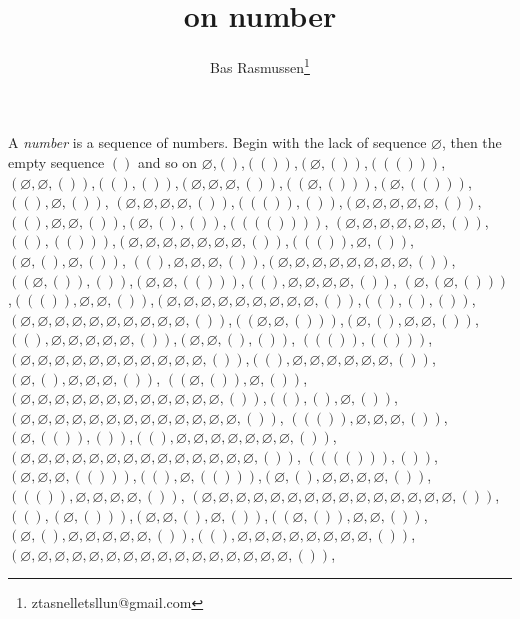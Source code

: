 \documentclass[12pt]{article}
\title{on number}
\author{Bas Rasmussen\thanks{ztasnelletsllun@gmail.com}}
\def\qua{()}
\newcommand{\quat}[1]{\left( #1 \right)}
\def\nul{\varnothing}
\begin{document}
\maketitle

A \emph{number} is a sequence of numbers.  Begin with the lack of sequence $\nul$, then the empty sequence $\qua$ and so on
$\nul$,$\qua$,$\quat{\qua}$,$\quat{\nul,\qua}$,$\quat{\quat{\qua}}$,$\quat{\nul,\nul,\qua}$,$\quat{\qua,\qua}$,$\quat{\nul,\nul,\nul,\qua}$,$\quat{\quat{\nul,\qua}}$,$\quat{\nul,\quat{\qua}}$,$\quat{\qua,\nul,\qua}$,
$\quat{\nul,\nul,\nul,\nul,\qua}$,$\quat{\quat{\qua},\qua}$,$\quat{\nul,\nul,\nul,\nul,\nul,\qua}$,$\quat{\qua,\nul,\nul,\qua}$,$\quat{\nul,\qua,\qua}$,$\quat{\quat{\quat{\qua}}}$,
$\quat{\nul,\nul,\nul,\nul,\nul,\nul,\qua}$,$\quat{\qua,\quat{\qua}}$,$\quat{\nul,\nul,\nul,\nul,\nul,\nul,\nul,\qua}$,$\quat{\quat{\qua},\nul,\qua}$,$\quat{\nul,\qua,\nul,\qua}$,
$\quat{\qua,\nul,\nul,\nul,\qua}$,$\quat{\nul,\nul,\nul,\nul,\nul,\nul,\nul,\nul,\qua}$,$\quat{\quat{\nul,\qua},\qua}$,$\quat{\nul,\nul,\quat{\qua}}$,$\quat{\qua,\nul,\nul,\nul,\nul,\qua}$,
$\quat{\nul,\quat{\nul,\qua}}$,$\quat{\quat{\qua},\nul,\nul,\qua}$,$\quat{\nul,\nul,\nul,\nul,\nul,\nul,\nul,\nul,\nul,\qua}$,$\quat{\qua,\qua,\qua}$,
$\quat{\nul,\nul,\nul,\nul,\nul,\nul,\nul,\nul,\nul,\nul,\qua}$,$\quat{\quat{\nul,\nul,\qua}}$,$\quat{\nul,\qua,\nul,\nul,\qua}$,$\quat{\qua,\nul,\nul,\nul,\nul,\nul,\qua}$,$\quat{\nul,\nul,\qua,\qua}$,
$\quat{\quat{\qua},\quat{\qua}}$,$\quat{\nul,\nul,\nul,\nul,\nul,\nul,\nul,\nul,\nul,\nul,\nul,\qua}$,$\quat{\qua,\nul,\nul,\nul,\nul,\nul,\nul,\qua}$,$\quat{\nul,\qua,\nul,\nul,\nul,\qua}$,
$\quat{\quat{\nul,\qua},\nul,\qua}$,$\quat{\nul,\nul,\nul,\nul,\nul,\nul,\nul,\nul,\nul,\nul,\nul,\nul,\qua}$,$\quat{\qua,\qua,\nul,\qua}$,$\quat{\nul,\nul,\nul,\nul,\nul,\nul,\nul,\nul,\nul,\nul,\nul,\nul,\nul,\qua}$,
$\quat{\quat{\qua},\nul,\nul,\nul,\qua}$,$\quat{\nul,\quat{\qua},\qua}$,$\quat{\qua,\nul,\nul,\nul,\nul,\nul,\nul,\nul,\qua}$,$\quat{\nul,\nul,\nul,\nul,\nul,\nul,\nul,\nul,\nul,\nul,\nul,\nul,\nul,\nul,\qua}$,
$\quat{\quat{\quat{\qua}},\qua}$,$\quat{\nul,\nul,\nul,\quat{\qua}}$,$\quat{\qua,\nul,\quat{\qua}}$,$\quat{\nul,\qua,\nul,\nul,\nul,\nul,\qua}$,$\quat{\quat{\qua},\nul,\nul,\nul,\nul,\qua}$,
$\quat{\nul,\nul,\nul,\nul,\nul,\nul,\nul,\nul,\nul,\nul,\nul,\nul,\nul,\nul,\nul,\qua}$,$\quat{\qua,\quat{\nul,\qua}}$,$\quat{\nul,\nul,\qua,\nul,\qua}$,$\quat{\quat{\nul,\qua},\nul,\nul,\qua}$,
$\quat{\nul,\qua,\nul,\nul,\nul,\nul,\nul,\qua}$,$\quat{\qua,\nul,\nul,\nul,\nul,\nul,\nul,\nul,\nul,\qua}$,$\quat{\nul,\nul,\nul,\nul,\nul,\nul,\nul,\nul,\nul,\nul,\nul,\nul,\nul,\nul,\nul,\nul,\qua}$,
\end{document}
